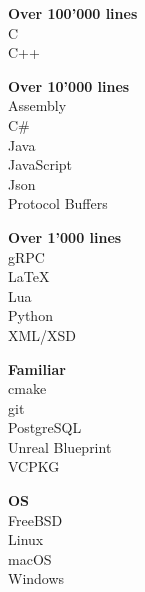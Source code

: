\documentclass[a4paper]{deedy-resume} %
\begin{document}
\begin{minipage}[t]{0.33\textwidth}
	\vspace{\topsep} %
	\begin{tightitemize}
		\item \textbf{Over 100'000 lines} \\ 
			\textbullet{} C \\
			\textbullet{} C++ \\
		\item \textbf{Over 10'000 lines} \\ 
			\textbullet{} Assembly \\
			\textbullet{} C\# \\ 
			\textbullet{} Java \\
			\textbullet{} JavaScript \\
			\textbullet{} Json \\
			\textbullet{} Protocol Buffers \\
		\item \textbf{Over 1'000 lines} \\ 
			\textbullet{} gRPC \\
			\textbullet{} \LaTeX \\
			\textbullet{} Lua \\
			\textbullet{} Python \\
			\textbullet{} XML/XSD \\
		\item \textbf{Familiar} \\ 
			\textbullet{} cmake \\
			\textbullet{} git \\
			\textbullet{} PostgreSQL \\
			\textbullet{} Unreal Blueprint \\
			\textbullet{} VCPKG \\
		\item \textbf{OS} \\ 
			\textbullet{} FreeBSD \\
			\textbullet{} Linux \\
			\textbullet{} macOS \\
			\textbullet{} Windows \\
	\end{tightitemize}

\sectionspace

\end{minipage}%
\hfill%
\end{document}

